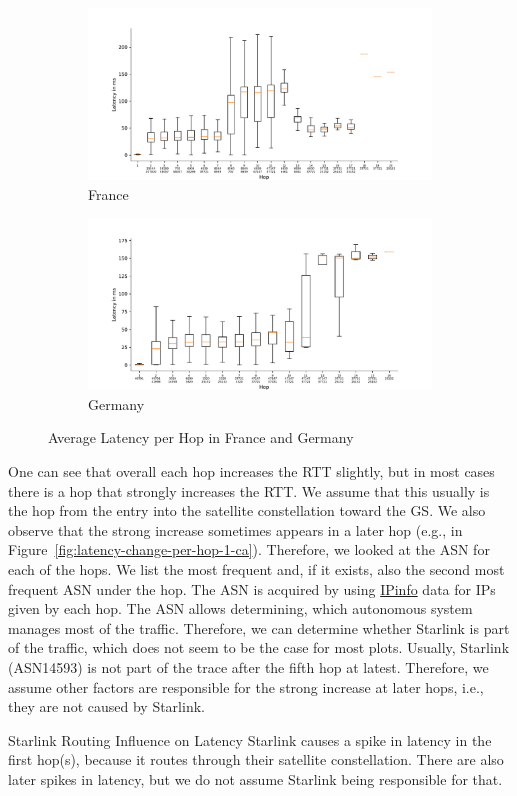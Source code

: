 \begin{figure}
	\centering
	\begin{subfigure}[b]{\linewidth}
		\includegraphics[width=\linewidth]{chapters/4-results/traceroute/img/latency-per-hop-FR-5001.pdf}
		\caption{France}
	\end{subfigure}
	\begin{subfigure}[b]{\linewidth}
		\includegraphics[width=\linewidth]{chapters/4-results/traceroute/img/latency-per-hop-DE-5001.pdf}
		\caption{Germany}
	\end{subfigure}
	\caption{Average Latency per Hop in France and Germany}
	\label{fig:latency-change-per-hop-2}
\end{figure}

One can see that overall each hop increases the RTT slightly, but in most cases
there is a hop that strongly increases the RTT. We assume that this usually is
the hop from the entry into the satellite constellation toward the \ac{GS}. We
also observe that the strong increase sometimes appears in a later hop (e.g.,
in Figure~\ref{fig:latency-change-per-hop-1-ca}). Therefore, we looked at the
\ac{ASN} for each of the hops. We list the most frequent and, if it exists,
also the second most frequent \ac{ASN} under the hop. The \ac{ASN} is acquired
by using \href{https://ipinfo.io/}{IPinfo} data for IPs given by each hop. The
\ac{ASN} allows determining, which autonomous system manages most of the
traffic. Therefore, we can determine whether Starlink is part of the traffic,
which does not seem to be the case for most plots. Usually, Starlink
(\ac{ASN}14593) is not part of the trace after the fifth hop at latest.
Therefore, we assume other factors are responsible for the strong increase at
later hops, i.e., they are not caused by Starlink.

\begin{takeaway}{Starlink Routing Influence on Latency}
	Starlink causes a spike in latency in the first hop(s), because it
	routes through their satellite constellation. There are also later
	spikes in latency, but we do not assume Starlink being responsible for
	that.
\end{takeaway}
